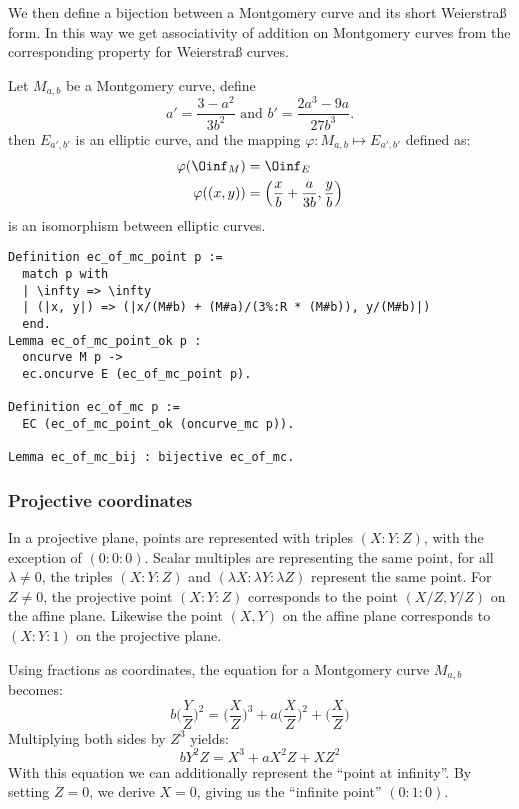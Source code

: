 We then define a bijection between a Montgomery curve and its short Weierstra{\ss} form.
In this way we get associativity of addition on Montgomery curves from the
corresponding property for Weierstra{\ss} curves.
\begin{lemma}
  Let $M_{a,b}$ be a Montgomery curve, define
  $$a' = \frac{3-a^2}{3b^2} \text{\ \ \ \ and\ \ \ \ } b' = \frac{2a^3 - 9a}{27b^3}.$$
  then $E_{a',b'}$ is an elliptic curve, and the mapping
  $\varphi : M_{a,b} \mapsto E_{a',b'}$ defined as:
  \begin{align*}
    \varphi(\Oinf_M) &= \Oinf_E\\
    \varphi( (x , y) ) &= \left( \frac{x}{b} + \frac{a}{3b} , \frac{y}{b} \right)
  \end{align*}
  is an isomorphism between elliptic curves.
\end{lemma}
\begin{lstlisting}[language=Coq,belowskip=-0.25 \baselineskip]
Definition ec_of_mc_point p :=
  match p with
  | \infty => \infty
  | (|x, y|) => (|x/(M#b) + (M#a)/(3%:R * (M#b)), y/(M#b)|)
  end.
Lemma ec_of_mc_point_ok p :
  oncurve M p ->
  ec.oncurve E (ec_of_mc_point p).

Definition ec_of_mc p :=
  EC (ec_of_mc_point_ok (oncurve_mc p)).

Lemma ec_of_mc_bij : bijective ec_of_mc.
\end{lstlisting}

\subsubsection{Projective coordinates}
\label{subsec:ECC-projective}

In a projective plane, points are represented with triples $(X:Y:Z)$,
with the exception of $(0:0:0)$.
Scalar multiples are representing the same point, \ie
for all $\lambda \neq 0$, the triples $(X:Y:Z)$ and $(\lambda X:\lambda Y:\lambda Z)$ represent
the same point.
For $Z\neq 0$, the projective point $(X:Y:Z)$ corresponds to the
point $(X/Z,Y/Z)$ on the affine plane. Likewise the point $(X,Y)$ on the
affine plane corresponds to $(X:Y:1)$ on the projective plane.

Using fractions as coordinates, the equation for a Montgomery curve $M_{a,b}$
becomes:
$$b \bigg(\frac{Y}{Z}\bigg)^2 = \bigg(\frac{X}{Z}\bigg)^3 + a \bigg(\frac{X}{Z}\bigg)^2 + \bigg(\frac{X}{Z}\bigg)$$
Multiplying both sides by $Z^3$ yields:
$$b Y^2Z = X^3 + a X^2Z + XZ^2$$
With this equation we can additionally represent the ``point at infinity''. By
setting $Z=0$, we derive $X=0$, giving us the ``infinite point'' $(0:1:0)$.

